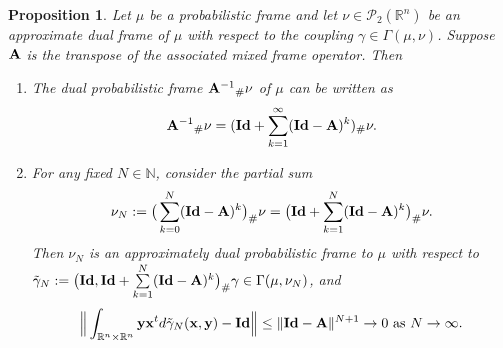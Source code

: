 \documentclass{amsart}
\numberwithin{equation}{section}
\theoremstyle{plain}
\newtheorem{proposition}[theorem]{Proposition}
\theoremstyle{remark}
\theoremstyle{definition}
\begin{document}
\begin{proposition}
    Let $\mu$ be a probabilistic frame and let $\nu \in \mathcal{P}_2(\mathbb{R}^n)$ be an approximate dual frame of $\mu$ with respect to the coupling  $\gamma \in \Gamma(\mu, \nu)$. Suppose ${\bf A}$ is the transpose of the associated mixed frame operator. Then 
     \begin{enumerate}
         \item \label{it:dual exp} The dual probabilistic frame ${{\bf A}^{-1}}_\#\nu$ of $\mu$ can be written as 
         \begin{equation*}
             {{\bf A}^{-1}}_\#\nu = ({\bf Id} + \sum_{k=1}^{\infty} ({\bf Id} - {\bf A})^k)_\# \nu.
         \end{equation*}
         \item \label{it:arbitrary resolution} For any fixed $N \in \mathbb{N}$, consider the partial sum
         \begin{equation*}
             \nu_N := \big (\sum_{k=0}^{N} ({\bf Id} - {\bf A})^k \big)_\# \nu  = \big({\bf Id} + \sum_{k=1}^{N} ({\bf Id} - {\bf A})^k \big)_\# \nu.
         \end{equation*}
         Then $ \nu_N$ is an approximately dual probabilistic frame to $\mu$ with respect to $\Tilde{\gamma}_N:=\big ({\bf Id}, {\bf Id} + \sum\limits_{k=1}^{N} ({\bf Id} - {\bf A})^k \big)_\#\gamma \in \Gamma(\mu, \nu_N)$, and 
         \begin{equation*}
          \Big \| \int_{\mathbb{R}^n \times \mathbb{R}^n} {\bf y} {\bf x}^t d\Tilde{\gamma}_N({\bf x, y}) - {\bf Id} \Big \|  \leq \| {\bf Id} -{\bf A}  \|^{N+1} \rightarrow 0 \ \text{as $N \rightarrow \infty$}.
\end{equation*}
     \end{enumerate}
\end{proposition}
\end{document}
